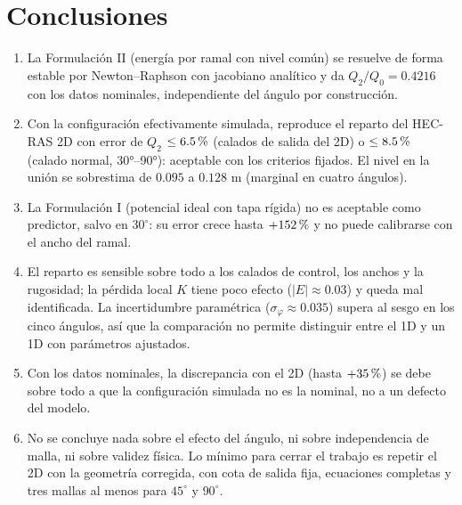 \section{Conclusiones}\label{sec:conclusiones}
\begin{enumerate}[label=\arabic*)]
\item La Formulación II (energía por ramal con nivel común) se resuelve de forma estable por Newton--Raphson con jacobiano analítico y da $Q_2/Q_0=0.4216$ con los datos nominales, independiente del ángulo por construcción.
\item Con la configuración efectivamente simulada, reproduce el reparto del HEC-RAS 2D con error de $Q_2$ $\leq6.5\text{\thinspace\%}$ (calados de salida del 2D) o $\leq8.5\text{\thinspace\%}$ (calado normal, 30°--90°): aceptable con los criterios fijados. El nivel en la unión se sobrestima de $0.095$ a $0.128$ m (marginal en cuatro ángulos).
\item La Formulación I (potencial ideal con tapa rígida) no es aceptable como predictor, salvo en $30^\circ$: su error crece hasta $+152\text{\thinspace\%}$ y no puede calibrarse con el ancho del ramal.
\item El reparto es sensible sobre todo a los calados de control, los anchos y la rugosidad; la pérdida local $K$ tiene poco efecto ($|E|\approx0.03$) y queda mal identificada. La incertidumbre paramétrica ($\sigma_\varphi\approx0.035$) supera al sesgo en los cinco ángulos, así que la comparación no permite distinguir entre el 1D y un 1D con parámetros ajustados.
\item Con los datos nominales, la discrepancia con el 2D (hasta $+35\text{\thinspace\%}$) se debe sobre todo a que la configuración simulada no es la nominal, no a un defecto del modelo.
\item No se concluye nada sobre el efecto del ángulo, ni sobre independencia de malla, ni sobre validez física. Lo mínimo para cerrar el trabajo es repetir el 2D con la geometría corregida, con cota de salida fija, ecuaciones completas y tres mallas al menos para $45^\circ$ y $90^\circ$.
\end{enumerate}
